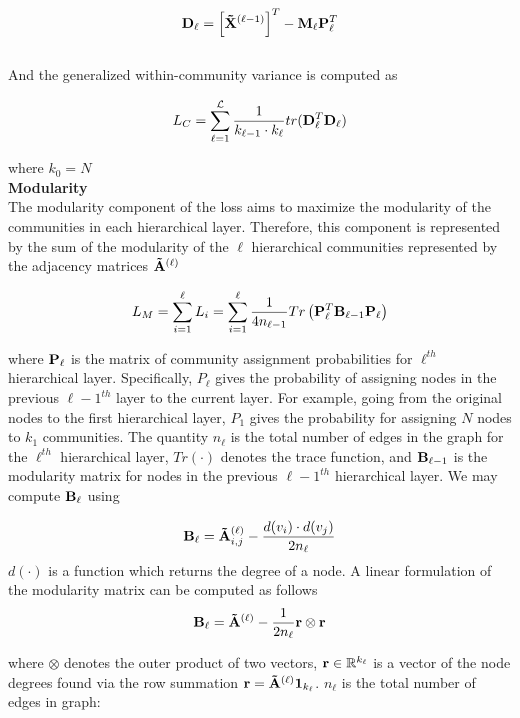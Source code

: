 \documentclass[a4paper,12pt]{article}
\begin{document}
\begin{itemize}
\begin{enumerate}
{{\begin{enumerate}
{					\[ {\bf D}_\ell =\left[{\bf \tilde X}^{(\ell-1)}\right]^T - {\bf M}_\ell{\bf P}_\ell^T \]\\
					
					And the generalized within-community variance is computed as 
					
					\[L_C = \sum_{\ell=1}^\mathcal{L} \frac{1}{k_{\ell-1}\cdot k_\ell} tr({\bf D}_\ell^T {\bf D}_\ell)\]
					
					where $k_0 = N$ \\
					
					
					\textbf{Modularity}\\
					The modularity component of the loss aims to maximize the modularity of the communities in each hierarchical layer. Therefore, this component is represented by the sum of the modularity of the $\ell$ hierarchical communities represented by the adjacency matrices ${\bf \tilde A}^{(\ell)}$
					
					\[L_M = \sum_{i = 1}^{\ell} L_i =  \sum_{i=1}^\ell \frac{1}{4n_{\ell-1}}Tr\left({\bf P}_\ell^T {\bf B}_{\ell-1} {\bf P}_\ell\right)\]
					
					where ${\bf P}_\ell$ is the matrix of community assignment probabilities for $\ell^{th}$ hierarchical layer. Specifically, ${P}_\ell$ gives the probability of assigning nodes in the previous $\ell -1 ^{th}$ layer to the current layer. For example, going from the original nodes to the first hierarchical layer, ${P}_1$ gives the probability for assigning $N$ nodes to $k_1$ communities. The quantity $n_{\ell}$ is the total number of edges in the graph for the  $\ell^{th}$ hierarchical layer, $Tr(\cdot)$ denotes the trace function, and ${\bf B}_{\ell-1}$ is the modularity matrix for nodes in the previous  $\ell-1^{th}$ hierarchical layer. We may compute ${\bf B}_\ell$ using
					
					\[{\bf B_\ell} = {\bf \tilde A}^{(\ell)}_{i,j} - \frac{d(v_i)\cdot d(v_j)}{2n_\ell}\]
					$d(\cdot)$ is a function which returns the degree of a node. A linear formulation of the modularity matrix can be computed as follows
					\[ {\bf B}_\ell = {\bf \tilde A}^{(\ell)} - \frac{1}{2n_\ell}{\bf r}\otimes{\bf r}\]
					
					where $\otimes$ denotes the outer product of two vectors, ${\bf r}\in\mathbb{R}^{k_\ell}$ is a vector of the node degrees found via the row summation ${\bf r}={\bf \tilde A}^{(\ell)}{\bf 1}_{k_\ell}$. $n_\ell$ is the total number of edges in graph:
					
}
\end{enumerate}}}
\end{enumerate}
\end{itemize}
\end{document}
